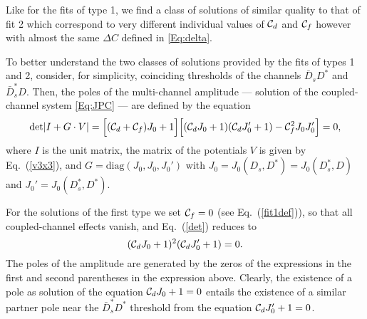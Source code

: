 \documentclass[preprint,12pt,3p]{elsarticle}
\newcommand{\be}{\begin{equation}}
\newcommand{\ee}{\end{equation}}
\begin{document}
Like for the fits of type 1, we find a class of solutions of similar quality to that of fit 2 which correspond to very different individual values of ${\cal C}_d$ and ${\cal C}_f$ however with almost the same $\Delta C$ defined in \eqref{Eq:delta}. 

To better understand the two classes of solutions provided by the fits of types 1 and 2, consider, for simplicity, coinciding thresholds of the channels $\bar{D}_s D^*$ and $\bar{D}_s^* D$. Then, the poles of the multi-channel amplitude --- solution of the coupled-channel system \eqref{Eq:JPC} --- are defined by the equation
\be
\mbox{det}|I+G\cdot V|=\Bigl[({\cal C}_d+{\cal C}_f)J_0+1\Bigr]\Bigl[({\cal C}_dJ_0+1)({\cal C}_dJ_0'+1)-{\cal C}_f^2J_0J_0'\Bigr]=0,
\label{det}
\ee
where $I$ is the unit matrix, the matrix of the potentials $V$ is given by Eq.~(\ref{v3x3}), and $G=\mbox{diag}(J_0,J_0,J_0')$ with $J_0=J_0(D_s,D^*)=J_0(D_s^*,D)$ and $J_0'=J_0(D_s^*,D^*)$.

For the solutions of the first type we set ${\cal C}_f=0$ (see Eq.~(\ref{fit1def})), so that all coupled-channel effects vanish, and Eq.~(\ref{det}) reduces to
\be
({\cal C}_d J_0+1)^2({\cal C}_d J_0'+1)=0.
\ee
The poles of the amplitude are generated by the zeros of the expressions in the first and second parentheses in the expression above. 
Clearly, the existence of a pole as solution of the equation ${\cal C}_d J_0+1=0$ entails the existence of a similar partner pole near the $\bar{D}_s^*D^*$ threshold
from the equation ${\cal C}_d J_0'+1=0$. 
\end{document}
